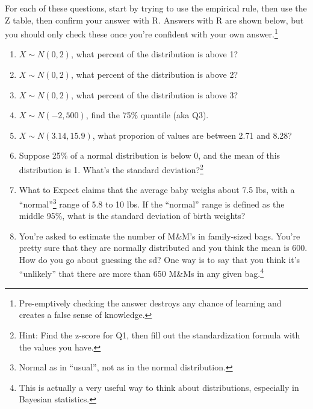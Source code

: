 \documentclass[
  letterpaper,
  DIV=11,
  numbers=noendperiod,
  oneside]{scrreprt}
\providecommand{\tightlist}{%
  \setlength{\itemsep}{0pt}\setlength{\parskip}{0pt}}\usepackage{longtable,booktabs,array}
\begin{document}
For each of these questions, start by trying to use the empirical rule,
then use the Z table, then confirm your answer with R. Answers with R
are shown below, but you should only check these once you're confident
with your own answer.\footnote{Pre-emptively checking the answer
  destroys any chance of learning and creates a false sense of
  knowledge.}

\begin{enumerate}
\def\labelenumi{\arabic{enumi}.}
\tightlist
\item
  \(X \sim N(0,2)\), what percent of the distribution is above 1?
\item
  \(X \sim N(0,2)\), what percent of the distribution is above 2?
\item
  \(X \sim N(0,2)\), what percent of the distribution is above 3?
\item
  \(X \sim N(-2, 500)\), find the 75\% quantile (aka Q3).
\item
  \(X \sim N(3.14, 15.9)\), what proporion of values are between 2.71
  and 8.28?
\item
  Suppose 25\% of a normal distribution is below 0, and the mean of this
  distribution is 1. What's the standard deviation?\footnote{Hint: Find
    the z-score for Q1, then fill out the standardization formula with
    the values you have.}
\item
  What to Expect claims that the average baby weighs about 7.5 lbs, with
  a ``normal''\footnote{Normal as in ``usual'', not as in the normal
    distribution.} range of 5.8 to 10 lbs. If the ``normal'' range is
  defined as the middle 95\%, what is the standard deviation of birth
  weights?
\item
  You're asked to estimate the number of M\&M's in family-sized bags.
  You're pretty sure that they are normally distributed and you think
  the mean is 600. How do you go about guessing the sd? One way is to
  say that you think it's ``unlikely'' that there are more than 650
  M\&Ms in any given bag.\footnote{This is actually a very useful way to
    think about distributions, especially in Bayesian statistics.}


\end{enumerate}
\end{document}
